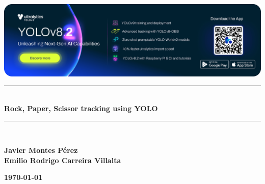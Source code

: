 
\begin{titlepage}

\newcommand{\HRule}{\rule{\linewidth}{0.5mm}} %

\begin{center} 

\includegraphics[width = 16cm]{./figures/banner-yolov8}\\[1.5cm] 

\HRule \\[0.3cm]
{ \huge \bfseries Rock, Paper, Scissor tracking \vspace{2.5mm} using YOLO }\\  
\HRule \\[1.5cm]


\end{center}

\begin{center}
     \textbf{Javier Montes Pérez \\ \vspace{1.5mm} Emilio Rodrigo Carreira Villalta }
\end{center}

\vfill

\begin{center}
    \textbf{\today} %
\end{center}

\end{titlepage}


